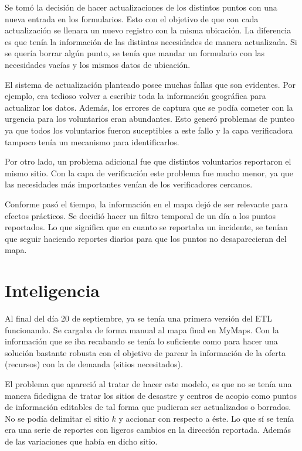 \documentclass[12pt,spanish,oneside,breaklinks]{book}
\begin{document}
Se tomó la decisión de hacer actualizaciones de los distintos puntos con una nueva entrada en los formularios. Esto con el objetivo de que con cada actualización se llenara un  nuevo registro con la misma ubicación. La diferencia es que tenía  la información de las distintas necesidades de manera actualizada. Si se quería borrar algún punto, se tenía que mandar un formulario con las necesidades vacías y los mismos datos de ubicación.

El sistema de actualización planteado posee muchas fallas que son evidentes. Por ejemplo, era tedioso volver a escribir toda la información geográfica para actualizar los datos. Además, los errores de captura que se  podía cometer con la urgencia para los voluntarios eran abundantes. Esto generó problemas de punteo ya que todos los voluntarios fueron suceptibles a este fallo y la capa verificadora tampoco tenía un mecanismo para identificarlos.

Por otro lado, un problema adicional fue que distintos voluntarios reportaron el mismo sitio. Con la capa de verificación este problema fue mucho menor, ya que las necesidades más importantes venían de los verificadores cercanos.

Conforme pasó el tiempo, la información en el mapa dejó de ser relevante para efectos prácticos. Se decidió hacer un filtro temporal de un día a los puntos reportados. Lo que significa que  en cuanto se reportaba un incidente, se tenían que seguir haciendo reportes diarios para que los puntos no desaparecieran del mapa.

\section{Inteligencia}
\label{sec:org3fe1785}

Al final del día 20 de septiembre, ya se tenía una primera versión del ETL funcionando.  Se cargaba de forma manual al mapa final en MyMaps. Con la información que se iba recabando se tenía lo suficiente como para hacer una solución bastante robusta con el objetivo de parear la información de la oferta (recursos) con la de demanda (sitios necesitados).

El problema que apareció al tratar de hacer este modelo, es que no se tenía una manera fidedigna de tratar los sitios de desastre y centros de acopio como puntos de información editables de tal forma que pudieran ser actualizados o borrados. No se podía delimitar el sitio \(k\) y accionar con respecto a éste. Lo que sí se tenía era una serie de reportes con ligeros cambios en la dirección reportada. Además de las variaciones que había en dicho sitio.
\end{document}
